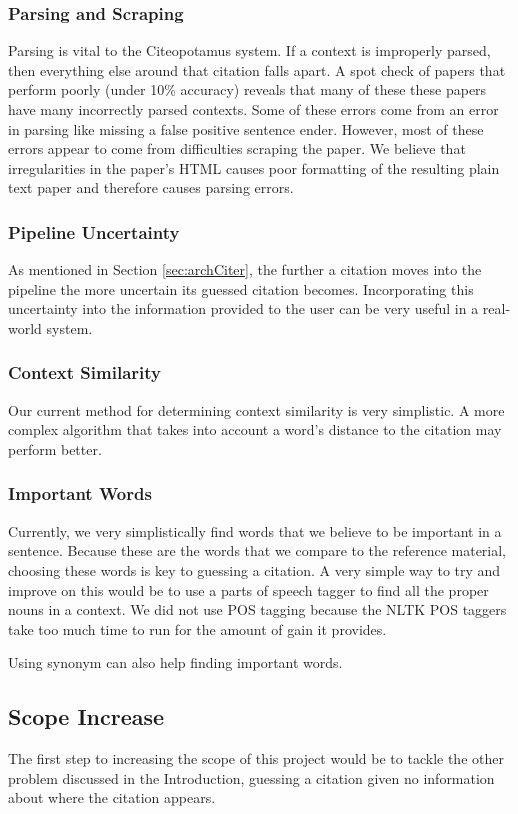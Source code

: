 \documentclass[10pt, conference, compsocconf]{IEEEtran}
\begin{document}
\subsubsection{Parsing and Scraping}
Parsing is vital to the Citeopotamus system. If a context is improperly parsed, then everything else around that citation falls apart.
A spot check of papers that perform poorly (under 10\% accuracy) reveals that many of these these papers have many incorrectly parsed contexts.
Some of these errors come from an error in parsing like missing a false positive sentence ender. However, most of these errors appear to
come from difficulties scraping the paper. We believe that irregularities in the paper's HTML causes poor formatting of the resulting
plain text paper and therefore causes parsing errors.

\subsubsection{Pipeline Uncertainty}
As mentioned in Section \ref{sec:archCiter}, the further a citation moves into the pipeline the more uncertain its guessed citation becomes.
Incorporating this uncertainty into the information provided to the user can be very useful in a real-world system.

\subsubsection{Context Similarity}
Our current method for determining context similarity is very simplistic. A more complex algorithm that takes into account a word's distance to the
citation may perform better.

\subsubsection{Important Words}
Currently, we very simplistically find words that we believe to be important in a sentence. Because these are the words that
we compare to the reference material, choosing these words is key to guessing a citation. A very simple way to try and improve on this
would be to use a parts of speech tagger to find all the proper nouns in a context. We did not use POS tagging because
the NLTK POS taggers take too much time to run for the amount of gain it provides.

Using synonym can also help finding important words.

\subsection{Scope Increase}
The first step to increasing the scope of this project would be to tackle the other problem discussed in the Introduction,
guessing a citation given no information about where the citation appears.
\end{document}
